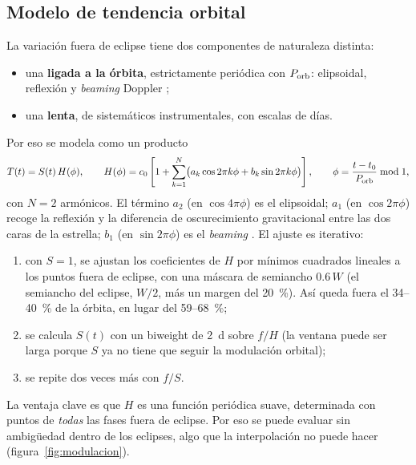 \documentclass[11pt,a4paper]{article}
\newcommand{\porb}{P_{\rm orb}}
\begin{document}
\subsection{Modelo de tendencia orbital}
La variación fuera de eclipse tiene dos componentes de naturaleza distinta:
\begin{itemize}
\item una \textbf{ligada a la órbita}, estrictamente periódica con $\porb$: elipsoidal, reflexión y
  \emph{beaming} Doppler \citep{Faigler2011,Shporer2017};
\item una \textbf{lenta}, de sistemáticos instrumentales, con escalas de días.
\end{itemize}
Por eso se modela como un producto
\begin{equation}
T(t)=S(t)\,H(\phi),\qquad
H(\phi)=c_0\left[1+\sum_{k=1}^{N}\bigl(a_k\cos2\pi k\phi+b_k\sin2\pi k\phi\bigr)\right],
\qquad \phi=\frac{t-t_0}{\porb}\bmod 1,
\label{eq:modelo}
\end{equation}
con $N=2$ armónicos. El término $a_2$ (en $\cos4\pi\phi$) es el elipsoidal; $a_1$ (en $\cos2\pi\phi$)
recoge la reflexión y la diferencia de oscurecimiento gravitacional entre las dos caras de la
estrella; $b_1$ (en $\sin2\pi\phi$) es el \emph{beaming} \citep{Loeb2003}. El ajuste es iterativo:
\begin{enumerate}
\item con $S=1$, se ajustan los coeficientes de $H$ por mínimos cuadrados lineales a los puntos fuera
  de eclipse, con una máscara de semiancho $0.6\,W$ (el semiancho del eclipse, $W/2$, más un margen del
  20~\%). Así queda fuera el 34--40~\% de la órbita, en lugar del 59--68~\%;
\item se calcula $S(t)$ con un biweight de 2~d sobre $f/H$ (la ventana puede ser larga porque $S$ ya no
  tiene que seguir la modulación orbital);
\item se repite dos veces más con $f/S$.
\end{enumerate}
La ventaja clave es que $H$ es una función periódica suave, determinada con puntos de \emph{todas} las
fases fuera de eclipse. Por eso se puede evaluar sin ambigüedad dentro de los eclipses, algo que la
interpolación no puede hacer (figura~\ref{fig:modulacion}).
\end{document}
